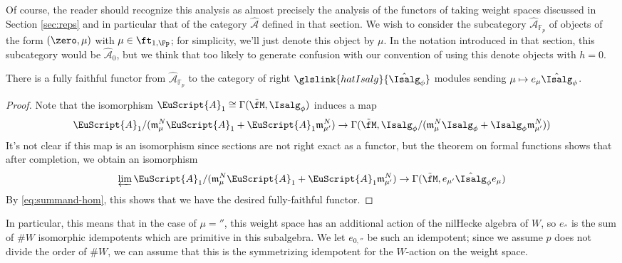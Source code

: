 Of course, the reader should recognize this analysis as almost precisely the analysis of the functors of taking weight spaces discussed in Section \ref{sec:reps} and in particular that of the category $\widehat{\mathscr{A}}$ defined in that section.  We wish to consider the subcategory $\widehat{\mathscr{A}}_{\mathbb{F}_p}$ of objects of the form $(\zero, \mu)$ with $\mu \in \ft_{1,\Fp}$; for simplicity, we'll just denote this object by $\mu$.  In the notation introduced in that section, this subcategory would be $\widehat{\mathscr{A}}_0$, but we think that too likely to generate confusion with our convention of using this denote objects with $h=0$.
\begin{lemma}\label{lem:A-H}
There is a fully faithful functor from  $\widehat{\mathscr{A}}_{\mathbb{F}_p}$ to the category of right $ \glslink{hatIsalg}{\hat{\Isalg}_\phi}$ modules sending  $\mu\mapsto e_{\mu}\hat{\Isalg}_\phi $.  
\end{lemma}
\begin{proof}
  Note that the isomorphism $\EuScript{A}_1\cong \Gamma(\tilde{\fM},{\Isalg}_\phi)$ induces a map
  \[ \EuScript{A}_1/(\mathfrak{m}_{\mu}^N
 \EuScript{A}_1+\EuScript{A}_1\mathfrak{m}_{\mu'}^N) \to \Gamma(\tilde{\fM}, {\Isalg}_\phi/(\mathfrak{m}_{\mu}^N
 {\Isalg}_\phi+{\Isalg}_\phi\mathfrak{m}_{\mu'}^N)  )\]
It's not clear if this map is an isomorphism since sections are not right exact as a functor, but the theorem on formal functions \cite[\href{https://stacks.math.columbia.edu/tag/02OC}{Theorem 02OC}]{stacks-project} shows that after completion, we obtain an isomorphism
  \[ \varprojlim
 \EuScript{A}_1/(\mathfrak{m}_{\mu}^N
 \EuScript{A}_1+\EuScript{A}_1\mathfrak{m}_{\mu'}^N)\to \Gamma(\tilde{\fM}, e_{\mu'}\hat{\Isalg}_\phi e_{\mu})\]
  By \eqref{eq:summand-hom}, this shows that we have the desired fully-faithful functor.
\end{proof}

In particular, this means that in the case of $\mu=\second$, this weight space has an additional action of the nilHecke algebra of $W$, so $e_{\second}$ is the sum of $\#W$ isomorphic idempotents which are primitive in this subalgebra. We let $e_{0,\second}$ be such an idempotent; since we assume  $p$ does not divide the order of $\# W$, we can assume that this is the symmetrizing idempotent for the $W$-action on the weight space.   


